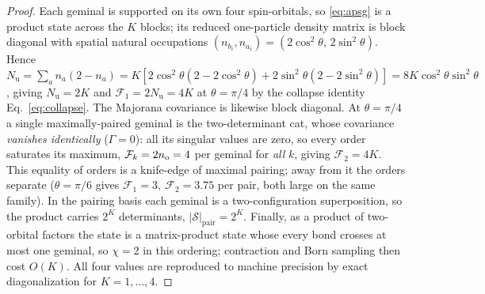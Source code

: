 \begin{proof}[Proof]
Each geminal is supported on its own four spin-orbitals, so \eqref{eq:apsg} is a product state across
the $K$ blocks; its reduced one-particle density matrix is block diagonal with spatial natural
occupations $(n_{b_i},n_{a_i})=(2\cos^2\theta,\,2\sin^2\theta)$. Hence
$N_{\mathrm u}=\sum_a n_a(2-n_a)=K\!\left[2\cos^2\theta(2-2\cos^2\theta)+2\sin^2\theta(2-2\sin^2\theta)\right]
=8K\cos^2\theta\sin^2\theta$, giving $N_{\mathrm u}=2K$ and $\mathcal F_1=2N_{\mathrm u}=4K$ at
$\theta=\pi/4$ by the collapse identity Eq.~\eqref{eq:collapse}. The Majorana covariance is likewise
block diagonal. At $\theta=\pi/4$ a single maximally-paired geminal is the two-determinant cat, whose
covariance \emph{vanishes identically} ($\Gamma=0$): all its singular values are zero, so every order
saturates its maximum, $\mathcal F_k=2n_{\rm o}=4$ per geminal for \emph{all} $k$, giving
$\mathcal F_2=4K$. This equality of orders is a knife-edge of maximal pairing; away from it the orders
separate ($\theta=\pi/6$ gives $\mathcal F_1=3,\ \mathcal F_2=3.75$ per pair, both large on the same
family). In the pairing basis each geminal is a two-configuration superposition, so the product carries
$2^{K}$ determinants, $|\mathcal S|_{\mathrm{pair}}=2^{K}$. Finally, as a product of two-orbital factors
the state is a matrix-product state whose every bond crosses at most one geminal, so $\chi=2$ in this
ordering; contraction and Born sampling then cost $O(K)$. All four values are reproduced to machine
precision by exact diagonalization for $K=1,\dots,4$.
\end{proof}

